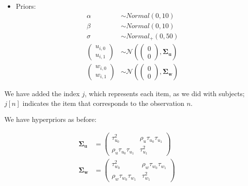 \documentclass[12pt,]{krantz}
\providecommand{\tightlist}{%
  \setlength{\itemsep}{0pt}\setlength{\parskip}{0pt}}
\theoremstyle{definition}
\theoremstyle{definition}
\theoremstyle{definition}
\theoremstyle{remark}
\begin{document}
\begin{itemize}
\tightlist
\item
  Priors:
  \begin{equation}
   \begin{aligned}
   \alpha & \sim Normal(0,10) \\
   \beta  & \sim Normal(0,10) \\
    \sigma  &\sim Normal_+(0,50)\\
    {\begin{pmatrix}
    u_{i,0} \\
    u_{i,1}
    \end{pmatrix}}
   &\sim {\mathcal {N}}
    \left(
   {\begin{pmatrix} 
    0\\
    0
   \end{pmatrix}}
   ,\boldsymbol{\Sigma_u} \right) \\
     {\begin{pmatrix}
    w_{i,0} \\
    w_{i,1}
    \end{pmatrix}}
   &\sim {\mathcal {N}}
    \left(
   {\begin{pmatrix} 
    0\\
    0
   \end{pmatrix}}
   ,\boldsymbol{\Sigma_w} \right) 
   \end{aligned}
   \end{equation}
\end{itemize}

We have added the index \(j\), which represents each item, as we did with subjects; \(j[n]\) indicates the item that corresponds to the observation \(n\).

We have hyperpriors as before:

\begin{equation}
\begin{aligned}
 \boldsymbol{\Sigma_u} & = 
{\begin{pmatrix} 
\tau_{u_0}^2 & \rho_u \tau_{u_0} \tau_{u_1} \\ 
\rho_u \tau_{u_0} \tau_{u_1} & \tau_{u_1}^2
\end{pmatrix}}\\
 \boldsymbol{\Sigma_w} & = 
{\begin{pmatrix} 
\tau_{w_0}^2 & \rho_w \tau_{w_0} \tau_{w_1} \\ 
\rho_w \tau_{w_0} \tau_{w_1} & \tau_{w_1}^2
\end{pmatrix}}
 \end{aligned}
\end{equation}
\end{document}
